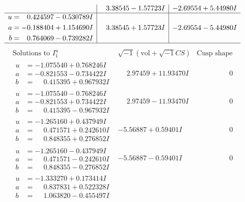 \documentclass[1p]{elsarticle_modified}
\theoremstyle{definition}
\newcommand{\I}{\sqrt{-1}}
\begin{document}
$$\begin{array}{c|c|c}
 & \phantom{-}3.38545 - 1.57723 I & -2.69554 + 5.44980 I \\ \hline\begin{aligned}
u &= \phantom{-}0.424597 - 0.530789 I \\
a &= -0.188404 + 1.154690 I \\
b &= \phantom{-}0.764069 - 0.739282 I\end{aligned}
 & \phantom{-}3.38545 + 1.57723 I & -2.69554 - 5.44980 I\\
 \hline 
 \end{array}$$\newpage$$\begin{array}{c|c|c}  
\text{Solutions to }I^u_{1}& \I (\text{vol} + \sqrt{-1}CS) & \text{Cusp shape}\\
 \hline 
\begin{aligned}
u &= -1.075540 + 0.768246 I \\
a &= -0.821553 - 0.734422 I \\
b &= \phantom{-}0.415395 + 0.967932 I\end{aligned}
 & \phantom{-}2.97459 + 11.93470 I & \phantom{-0.000000 } 0 \\ \hline\begin{aligned}
u &= -1.075540 - 0.768246 I \\
a &= -0.821553 + 0.734422 I \\
b &= \phantom{-}0.415395 - 0.967932 I\end{aligned}
 & \phantom{-}2.97459 - 11.93470 I & \phantom{-0.000000 } 0 \\ \hline\begin{aligned}
u &= -1.265160 + 0.437949 I \\
a &= \phantom{-}0.471571 + 0.242610 I \\
b &= \phantom{-}0.848355 + 0.276852 I\end{aligned}
 & -5.56887 + 0.59401 I & \phantom{-0.000000 } 0 \\ \hline\begin{aligned}
u &= -1.265160 - 0.437949 I \\
a &= \phantom{-}0.471571 - 0.242610 I \\
b &= \phantom{-}0.848355 - 0.276852 I\end{aligned}
 & -5.56887 - 0.59401 I & \phantom{-0.000000 } 0 \\ \hline\begin{aligned}
u &= -1.333270 + 0.173414 I \\
a &= \phantom{-}0.837831 + 0.522328 I \\
b &= \phantom{-}1.063820 - 0.455497 I\end{aligned}

\end{array}$$
\end{document}

